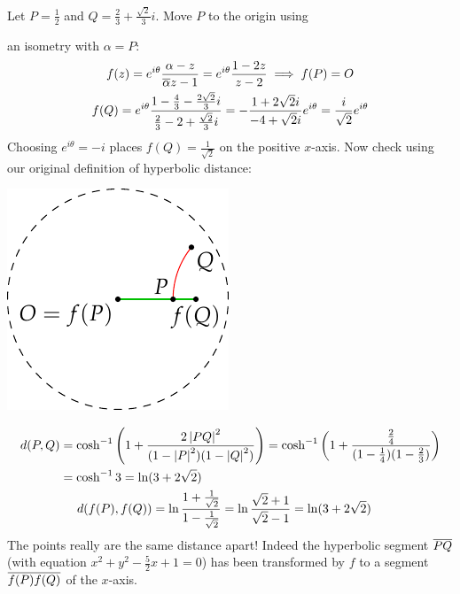 \begin{example}{}{}
	Let $P=\frac 12$ and $Q=\frac 23+\frac{\sqrt 2}3i$. Move $P$ to the origin using\par
	\begin{minipage}[t]{0.74\linewidth}\vspace{-8pt}
		an isometry with $\alpha=P$:
		\begin{gather*}
			f(z)=e^{i\theta}\frac{\alpha-z}{\overline{\alpha} z-1}=e^{i\theta}\frac{1-2z}{z-2} \implies f(P)=O\\
			f(Q)=e^{i\theta}\frac{1-\frac 43-\frac{2\sqrt 2}3i}{\frac 23-2+\frac{\sqrt 2}3i} =-\frac{1+2\sqrt 2i}{-4+\sqrt 2i}e^{i\theta} =\frac{i}{\sqrt 2}e^{i\theta}
		\end{gather*}
		Choosing $e^{i\theta}=-i$ places $f(Q)=\frac 1{\sqrt 2}$ on the positive $x$-axis. Now check using our original definition of hyperbolic distance:
	\end{minipage}
	\hfill
	\begin{minipage}[t]{0.25\linewidth}\vspace{-20pt}
		\flushright\includegraphics{calc-triangle2}
	\end{minipage}\par\vspace{-4pt}
	\begin{gather*}
		\begin{aligned}
			d(P,Q)&=\cosh^{-1}\left(1+\frac{2\left| PQ\right|^2}{(1-\left| P\right|^2)(1-\left| Q\right|^2)}\right) =\cosh^{-1}\left(1+\frac{\frac 24}{(1-\frac 14)(1-\frac 23)}\right)\\
			&=\cosh^{-1}3=\ln(3+2\sqrt 2)
		\end{aligned}\\
		\begin{aligned}
			d(f(P),f(Q))&=\ln\frac{1+\frac 1{\sqrt 2}}{1-\frac 1{\sqrt 2}}=\ln\frac{\sqrt 2+1}{\sqrt 2-1}=\ln(3+2\sqrt 2)
		\end{aligned}
	\end{gather*}
	The points really are the same distance apart! Indeed the hyperbolic segment \textcolor{red}{$\overline{PQ}$} (with equation $x^2+y^2-\frac 52x+1=0$) has been transformed by $f$ to a segment \textcolor{Green}{$\overline{f(P)f(Q)}$} of the $x$-axis.
\end{example}

